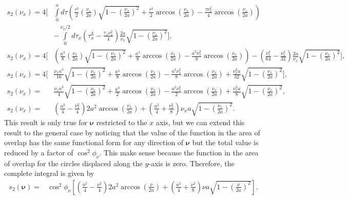 \documentclass[11pt]{article}
\providecommand{\bs}[1]{\boldsymbol{#1}}
\begin{document}
\begin{align}
  s_2(\nu_x) = 4\Bigg[&\int\limits_0^a d\tau\left(\frac{\tau^3}{2}\left(\frac{\nu_x}{2a}\right)\sqrt{1 - \left(\frac{\nu_x}{2a}\right)^2} + \frac{\tau^3}{2}\arccos\left(\frac{\nu_x}{2a}\right) - \frac{\tau\nu_x^2}{4}\arccos\left(\frac{\nu_x}{2a}\right)\right)\nonumber \\ &- \int\limits_0^{\nu_x/2}d\tau_x \left(\tau_x^3 - \frac{\tau_x\nu_x^2}{4}\right)\frac{2 a}{\nu_x}\sqrt{1 - \left(\frac{\nu_x}{2a}\right)^2}\Bigg],\\
  s_2(\nu_x) = 4\Bigg[&\left(\frac{a^4}{8}\left(\frac{\nu_x}{2a}\right)\sqrt{1 - \left(\frac{\nu_x}{2a}\right)^2} + \frac{a^4}{8}\arccos\left(\frac{\nu_x}{2a}\right) - \frac{a^2\nu_x^2}{8}\arccos\left(\frac{\nu_x}{2a}\right)\right) - \left(\frac{\nu_x^4}{64} - \frac{\nu_x^4}{32}\right)\frac{2 a}{\nu_x}\sqrt{1 - \left(\frac{\nu_x}{2a}\right)^2}\Bigg],\\
  s_2(\nu_x) = 4\Bigg[&\frac{\nu_xa^3}{16}\sqrt{1 - \left(\frac{\nu_x}{2a}\right)^2} + \frac{a^4}{8}\arccos\left(\frac{\nu_x}{2a}\right) - \frac{a^2\nu_x^2}{8}\arccos\left(\frac{\nu_x}{2a}\right) + \frac{\nu_x^3a}{32}\sqrt{1 - \left(\frac{\nu_x}{2a}\right)^2}\Bigg],\\
  s_2(\nu_x) = &\frac{\nu_xa^3}{4}\sqrt{1 - \left(\frac{\nu_x}{2a}\right)^2} + \frac{a^4}{2}\arccos\left(\frac{\nu_x}{2a}\right) - \frac{a^2\nu_x^2}{2}\arccos\left(\frac{\nu_x}{2a}\right) + \frac{\nu_x^3a}{8}\sqrt{1 - \left(\frac{\nu_x}{2a}\right)^2},\\
  s_2(\nu_x) = &\left(\frac{a^2}{4} - \frac{\nu_x^2}{4}\right)2a^2\arccos\left(\frac{\nu_x}{2a}\right) + \left(\frac{a^2}{4} + \frac{\nu_x^2}{8}\right)\nu_x a \sqrt{1 - \left(\frac{\nu_x}{2a}\right)^2}.
\end{align}
This result is only true for $\bs{\nu}$ restricted to the $x$ axis, but we can
extend this result to the general case by noticing that the value of the
function in the area of overlap has the same functional form for any direction
of $\bs{\nu}$ but the total value is reduced by a factor of $\cos^2\phi_\nu$.
This make sense because the function in the area of overlap for the circles
displaced along the $y$-axis is zero. Therefore, the complete integral is given
by 
\begin{align}
    s_2(\bs{\nu}) = &\cos^2\phi_\nu\left[\left(\frac{a^2}{4} - \frac{\nu^2}{4}\right)2a^2\arccos\left(\frac{\nu}{2a}\right) + \left(\frac{a^2}{4} + \frac{\nu^2}{8}\right)\nu a\sqrt{1 - \left(\frac{\nu}{2a}\right)^2}\right].
\end{align}
\end{document}
